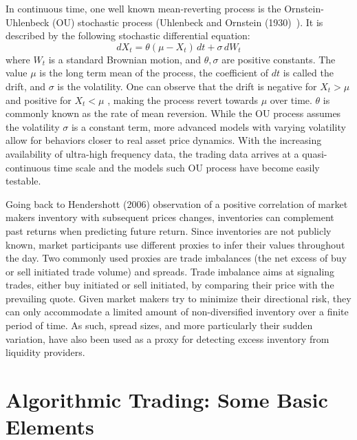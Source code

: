 In continuous time, one well known mean-reverting process is the Ornstein-Uhlenbeck (OU) stochastic process (Uhlenbeck and Ornstein (1930)~\cite{uhlenbeck}). It is described by the following stochastic differential equation:
	\begin{equation}\label{eqn:dxttheta}
	 dX_t = \theta(\mu - X_t)\,dt + \sigma \, dW_t 
	\end{equation}
where $W_t$ is a standard Brownian motion, and $\theta, \sigma$ are positive constants. The value $\mu$ is the long term mean of the process, the coefficient of $dt$ is called the drift, and $\sigma$ is the volatility. One can observe that the drift is negative for $X_t > \mu$ and positive for $X_t < \mu$ , making the process revert towards $\mu$ over time. $\theta$ is commonly known as the rate of mean reversion. While the OU process assumes the volatility $\sigma$ is a constant term, more advanced models with varying volatility allow for behaviors closer to real asset price dynamics. With the increasing availability of ultra-high frequency data, the trading data arrives at a quasi-continuous time scale and the models such OU process have become easily testable.


Going back to Hendershott (2006) observation of a positive correlation of market makers inventory with subsequent prices changes, inventories can complement past returns when predicting future return. Since inventories are not publicly known, market participants use different proxies to infer their values throughout the day. Two commonly used proxies are trade imbalances (the net excess of buy or sell initiated trade volume) and spreads. Trade imbalance aims at signaling trades, either buy initiated or sell initiated, by comparing their price with the prevailing quote. Given market makers try to minimize their directional risk, they can only accommodate a limited amount of non-diversified inventory over a finite period of time. As such, spread sizes, and more particularly their sudden variation, have also been used as a proxy for detecting excess inventory from liquidity providers.


\section{Algorithmic Trading: Some Basic Elements}


